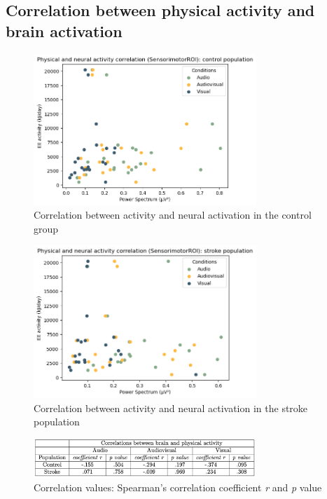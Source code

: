\subsection*{Correlation between physical activity and brain activation}
\begin{figure}[H]
    \centering
    \includegraphics[width=0.75\textwidth]{scatter_plots/h_sensorimotor_activeq.png}
    \caption{Correlation between activity and neural activation in the control group}
    \label{fig: correlation activeq control} 
\end{figure}
\begin{figure}[H]
    \centering
    \includegraphics[width=0.75\textwidth]{scatter_plots/s_sensorimotor_activeq.png}
    \caption{Correlation between activity and neural activation in the stroke population}
    \label{fig: correlation activeq stroke} 
\end{figure}
\begin{figure}[H]
    \centering
    \includegraphics[width=0.75\textwidth]{significance_tables/correlation_activeq_.png}
    \caption{Correlation values: Spearman's correlation coefficient \textit{r} and \textit{p} value}
    \label{fig: significance correlation activeq} 
\end{figure}


